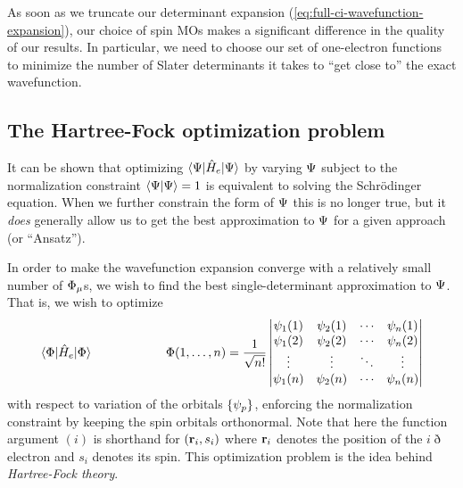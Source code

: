 \documentclass[11pt]{article}
\numberwithin{equation}{section}
\begin{document}
As soon as we truncate our determinant expansion (\ref{eq:full-ci-wavefunction-expansion}), our choice of spin MOs makes a significant difference in the quality of our results.
In particular, we need to choose our set of one-electron functions to minimize the number of Slater determinants it takes to ``get close to'' the exact wavefunction.


\subsection{The Hartree-Fock optimization problem}

It can be shown that optimizing $\langle\Psi |\hat{H}_e|\Psi \rangle$ by varying $\Psi $ subject to the normalization constraint $\langle\Psi |\Psi \rangle=1$ is equivalent to solving the Schr\"odinger equation.
When we further constrain the form of $\Psi $ this is no longer true, but it \textit{does} generally allow us to get the best approximation to $\Psi $ for a given approach (or ``Ansatz'').

In order to make the wavefunction expansion converge with a relatively small number of $\F_\mu$s, we wish to find the best single-determinant approximation to $\Psi $.
That is, we wish to optimize
\begin{align}
  \ip{\F|\op{H}_e|\F}
\sp\sp
  \F(1,\ld,n)
=
\fr{1}{\sqrt{n!}}
\left|\ar{
  \y_1(1)&\y_2(1)&\cd&\y_n(1)\\
  \y_1(2)&\y_2(2)&\cd&\y_n(2)\\
  \vd    &\vd    &\dd&\vd    \\
  \y_1(n)&\y_2(n)&\cd&\y_n(n)}\right|
\end{align}
with respect to variation of the orbitals $\{\psi _p\}$, enforcing the normalization constraint by keeping the spin orbitals orthonormal.
Note that here the function argument $(i)$ is shorthand for $(\mathbf{r}_i,s_i)$ where $\mathbf{r}_i$ denotes the position of the $i\eth$ electron and $s_i$ denotes its spin.
This optimization problem is the idea behind \textit{Hartree-Fock theory}.
\end{document}
